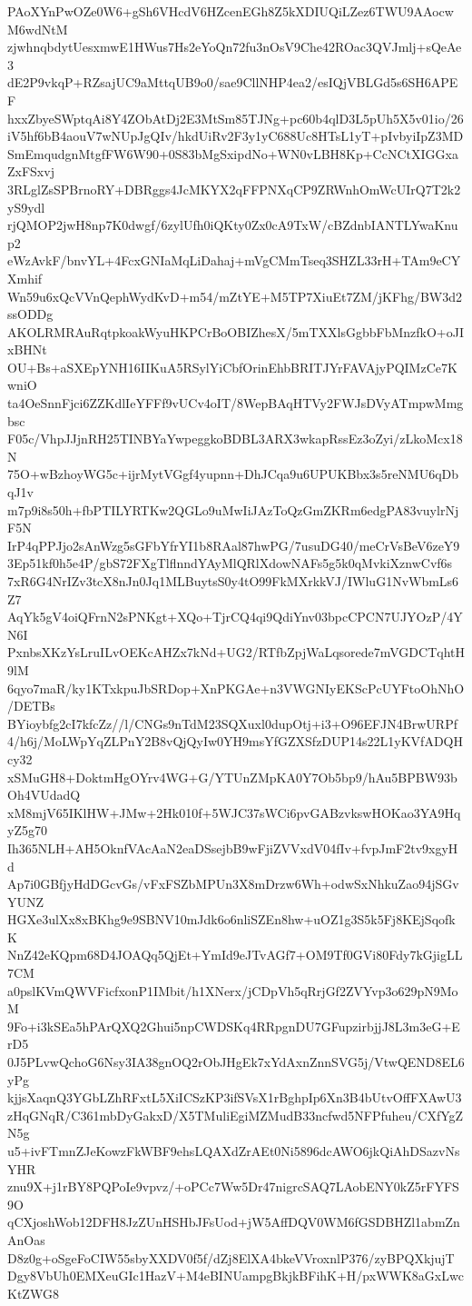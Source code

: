 PAoXYnPwOZe0W6+gSh6VHcdV6HZcenEGh8Z5kXDIUQiLZez6TWU9AAocwM6wdNtM
zjwhnqbdytUesxmwE1HWus7Hs2eYoQn72fu3nOsV9Che42ROac3QVJmlj+sQeAe3
dE2P9vkqP+RZsajUC9aMttqUB9o0/sae9CllNHP4ea2/esIQjVBLGd5s6SH6APEF
hxxZbyeSWptqAi8Y4ZObAtDj2E3MtSm85TJNg+pc60b4qlD3L5pUh5X5v01io/26
iV5hf6bB4aouV7wNUpJgQIv/hkdUiRv2F3y1yC688Uc8HTsL1yT+pIvbyiIpZ3MD
SmEmqudgnMtgfFW6W90+0S83bMgSxipdNo+WN0vLBH8Kp+CcNCtXIGGxaZxFSxvj
3RLglZsSPBrnoRY+DBRggs4JcMKYX2qFFPNXqCP9ZRWnhOmWcUIrQ7T2k2yS9ydl
rjQMOP2jwH8np7K0dwgf/6zylUfh0iQKty0Zx0cA9TxW/cBZdnbIANTLYwaKnup2
eWzAvkF/bnvYL+4FcxGNIaMqLiDahaj+mVgCMmTseq3SHZL33rH+TAm9eCYXmhif
Wn59u6xQcVVnQephWydKvD+m54/mZtYE+M5TP7XiuEt7ZM/jKFhg/BW3d2ssODDg
AKOLRMRAuRqtpkoakWyuHKPCrBoOBIZhesX/5mTXXlsGgbbFbMnzfkO+oJIxBHNt
OU+Bs+aSXEpYNH16IIKuA5RSylYiCbfOrinEhbBRITJYrFAVAjyPQIMzCe7KwniO
ta4OeSnnFjci6ZZKdlIeYFFf9vUCv4oIT/8WepBAqHTVy2FWJsDVyATmpwMmgbsc
F05c/VhpJJjnRH25TINBYaYwpeggkoBDBL3ARX3wkapRssEz3oZyi/zLkoMcx18N
75O+wBzhoyWG5c+ijrMytVGgf4yupnn+DhJCqa9u6UPUKBbx3s5reNMU6qDbqJ1v
m7p9i8s50h+fbPTILYRTKw2QGLo9uMwIiJAzToQzGmZKRm6edgPA83vuylrNjF5N
IrP4qPPJjo2sAnWzg5sGFbYfrYI1b8RAal87hwPG/7usuDG40/meCrVsBeV6zeY9
3Ep51kf0h5e4P/gbS72FXgTlflnndYAyMlQRlXdowNAFs5g5k0qMvkiXznwCvf6s
7xR6G4NrIZv3tcX8nJn0Jq1MLBuytsS0y4tO99FkMXrkkVJ/IWluG1NvWbmLs6Z7
AqYk5gV4oiQFrnN2sPNKgt+XQo+TjrCQ4qi9QdiYnv03bpcCPCN7UJYOzP/4YN6I
PxnbsXKzYsLruILvOEKcAHZx7kNd+UG2/RTfbZpjWaLqsorede7mVGDCTqhtH9lM
6qyo7maR/ky1KTxkpuJbSRDop+XnPKGAe+n3VWGNIyEKScPcUYFtoOhNhO/DETBs
BYioybfg2cI7kfcZz//l/CNGs9nTdM23SQXuxl0dupOtj+i3+O96EFJN4BrwURPf
4/h6j/MoLWpYqZLPnY2B8vQjQyIw0YH9msYfGZXSfzDUP14s22L1yKVfADQHcy32
xSMuGH8+DoktmHgOYrv4WG+G/YTUnZMpKA0Y7Ob5bp9/hAu5BPBW93bOh4VUdadQ
xM8mjV65IKlHW+JMw+2Hk010f+5WJC37sWCi6pvGABzvkswHOKao3YA9HqyZ5g70
Ih365NLH+AH5OknfVAcAaN2eaDSsejbB9wFjiZVVxdV04fIv+fvpJmF2tv9xgyHd
Ap7i0GBfjyHdDGcvGs/vFxFSZbMPUn3X8mDrzw6Wh+odwSxNhkuZao94jSGvYUNZ
HGXe3ulXx8xBKhg9e9SBNV10mJdk6o6nliSZEn8hw+uOZ1g3S5k5Fj8KEjSqofkK
NnZ42eKQpm68D4JOAQq5QjEt+YmId9eJTvAGf7+OM9Tf0GVi80Fdy7kGjigLL7CM
a0pslKVmQWVFicfxonP1IMbit/h1XNerx/jCDpVh5qRrjGf2ZVYvp3o629pN9MoM
9Fo+i3kSEa5hPArQXQ2Ghui5npCWDSKq4RRpgnDU7GFupzirbjjJ8L3m3eG+ErD5
0J5PLvwQchoG6Nsy3IA38gnOQ2rObJHgEk7xYdAxnZnnSVG5j/VtwQEND8EL6yPg
kjjsXaqnQ3YGbLZhRFxtL5XiICSzKP3ifSVsX1rBghpIp6Xn3B4bUtvOffFXAwU3
zHqGNqR/C361mbDyGakxD/X5TMuliEgiMZMudB33ncfwd5NFPfuheu/CXfYgZN5g
u5+ivFTmnZJeKowzFkWBF9ehsLQAXdZrAEt0Ni5896dcAWO6jkQiAhDSazvNsYHR
znu9X+j1rBY8PQPoIe9vpvz/+oPCc7Ww5Dr47nigrcSAQ7LAobENY0kZ5rFYFS9O
qCXjoshWob12DFH8JzZUnHSHbJFsUod+jW5AffDQV0WM6fGSDBHZl1abmZnAnOas
D8z0g+oSgeFoCIW55sbyXXDV0f5f/dZj8ElXA4bkeVVroxnlP376/zyBPQXkjujT
Dgy8VbUh0EMXeuGIc1HazV+M4eBINUampgBkjkBFihK+H/pxWWK8aGxLwcKtZWG8
